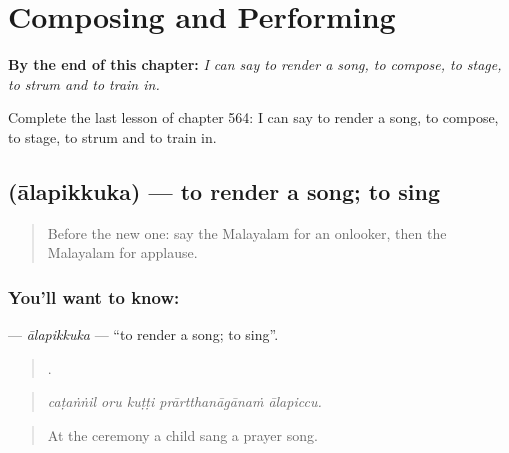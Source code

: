
\chapter{Composing and Performing}
\label{ch:ml-composing-and-performing}

\begin{chapteropening}
\textbf{By the end of this chapter:} \emph{I can say to render a song, to compose, to stage, to strum and to train in.}

Complete the last lesson of chapter 564: I can say to render a song, to compose, to stage, to strum and to train in.
\end{chapteropening}

\section[\texorpdfstring{\ml{ആലപിക്കുക} (ālapikkuka)}{ആലപിക്കുക (ālapikkuka)}]{ (ālapikkuka) — to render a song; to sing}

\label{lesson:ML-C564-alapikkuka}



\begin{quote}
Before the new one: say the Malayalam for an onlooker, then the Malayalam for applause.
\end{quote}

\subsection*{You'll want to know: }
\textbf{} — \emph{ālapikkuka} — \textquotedblleft{}to render a song; to sing\textquotedblright{}.

\begin{quote}
    .
\end{quote}

\begin{quote}
\emph{caṭaṅṅil oru kuṭṭi prārtthanāgānaṁ ālapiccu.}
\end{quote}

\begin{quote}
At the ceremony a child sang a prayer song.
\end{quote}

